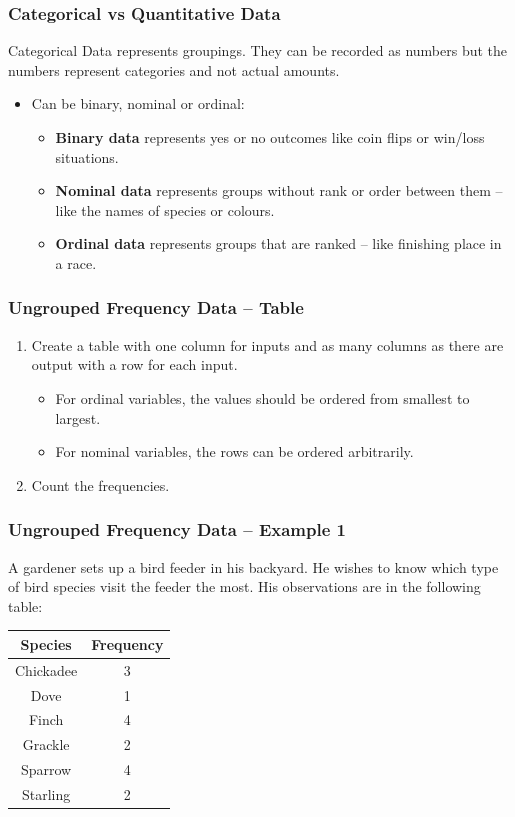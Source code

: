 \documentclass[aspectratio=169,11pt,svgnames]{beamer}
\begin{document}
\begin{frame}
 \frametitle{Categorical vs Quantitative Data}
 \alert{Categorical Data} represents groupings. They can be recorded as numbers
 but the numbers represent categories and not actual amounts.
 \pause
 \begin{itemize}[label=\textbullet]
  \item Can be binary, nominal or ordinal:
  \pause
  \begin{itemize}[label=$\circ$]
   \item \textbf{Binary data} represents yes or no outcomes like coin flips or
    win/loss situations.
   \pause
   \item \textbf{Nominal data} represents groups without rank or order between
    them -- like the names of species or colours.
   \pause
   \item \textbf{Ordinal data} represents groups that are ranked -- like
    finishing place in a race.
  \end{itemize}
 \end{itemize}
\end{frame}

\begin{frame}
 \frametitle{Ungrouped Frequency Data -- Table}
 \begin{enumerate}
  \item Create a table with one column for inputs and as many columns as there
   are output with a row for each input.
   \pause
   \begin{itemize}
    \item For \alert{ordinal} variables, the values should be ordered from
     smallest to largest.
    \pause
    \item For \alert{nominal} variables, the rows can be ordered arbitrarily.
   \end{itemize}
  \item Count the \alert{frequencies}.
 \end{enumerate}
\end{frame}

\begin{frame}
 \frametitle{Ungrouped Frequency Data -- Example 1}
 A gardener sets up a bird feeder in his backyard. He wishes to know which type
 of bird species visit the feeder the most.
 \pause
 His observations are in the following table:
 \begin{center}
  \begin{tabular}{c|c}
   \textbf{Species} & \textbf{Frequency}\\
   \toprule
   Chickadee & 3\\
   Dove & 1\\
   Finch & 4\\
   Grackle & 2\\
   Sparrow & 4\\
   Starling & 2
  \end{tabular}
 \end{center}
\end{frame}
\end{document}
